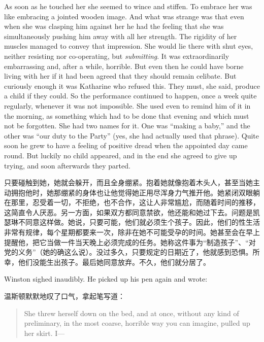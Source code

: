 \begin{paracol}{2}
As soon as he touched her she seemed to wince and stiffen. To embrace
her was like embracing a jointed wooden image. And what was strange was
that even when she was clasping him against her he had the feeling that
she was simultaneously pushing him away with all her strength. The
rigidity of her muscles managed to convey that impression. She would lie
there with shut eyes, neither resisting nor co-operating, but
\emph{submitting}. It was extraordinarily embarrassing and, after a
while, horrible. But even then he could have borne living with her if it
had been agreed that they should remain celibate. But curiously enough
it was Katharine who refused this. They must, she said, produce a child
if they could. So the performance continued to happen, once a week quite
regularly, whenever it was not impossible. She used even to remind him
of it in the morning, as something which had to be done that evening and
which must not be forgotten. She had two names for it. One was ``making a
baby,'' and the other was ``our duty to the Party'' (yes, she had actually
used that phrase). Quite soon he grew to have a feeling of positive
dread when the appointed day came round. But luckily no child appeared,
and in the end she agreed to give up trying, and soon afterwards they
parted.

\switchcolumn

只要碰触到她，她就会躲开，而且全身绷紧。抱着她就像抱着木头人，甚至当她主动拥抱他时，她那绷紧的身体也让他觉得她正用尽浑身力气推开他。她紧闭双眼躺在那里，忍受着一切，不拒绝，也不合作，这让人非常尴尬，而随着时间的推移，这简直令人厌恶。另一方面，如果双方都同意禁欲，他还能和她过下去。问题是凯瑟琳不同意这样做。她说，只要可能，他们就必须生个孩子。因此，他们的性生活非常有规律，每个星期都要来一次，除非在她不可能受孕的时间。她甚至会在早上提醒他，把它当做一件当天晚上必须完成的任务。她称这件事为``制造孩子''、``对党的义务''（她的确这么说）。没过多久，只要规定的日期近了，他就感到恐惧。所幸，他们没能生出孩子。最后她同意放弃。不久，他们就分居了。

\switchcolumn*

Winston sighed inaudibly. He picked up his pen again and wrote:

\switchcolumn

温斯顿默默地叹了口气，拿起笔写道：

\switchcolumn*

\begin{quotation}
She threw herself down on the bed, and at once, without any kind
of preliminary, in the most coarse, horrible way you can imagine, pulled
up her skirt. I---
\end{quotation}


\end{paracol}
